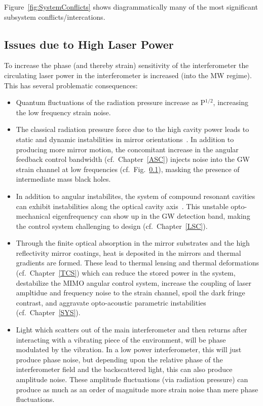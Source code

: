 Figure~\ref{fig:SystemConflicts} shows diagrammatically many of the most
significant subsystem conflicts/intercations.

\subsection{Issues due to High Laser Power}
To increase the phase (and thereby strain) sensitivity of the interferometer
the circulating laser power in the interferometer is increased (into the MW
regime). This has several problematic consequences:
\begin{itemize}
\item Quantum fluctuations of the radiation pressure increase as P$^{1/2}$, increasing the low frequency strain noise.
\item The classical radiation pressure force due to the high cavity power
leads to static and dynamic instabilities in mirror
orientations~\cite{Sidles:2006un, Dooley:13, aLIGO:ASC}. In addition to producing
more mirror motion, the concomitant increase in the angular feedback
control bandwidth (cf.~Chapter~\ref{ASC}) injects noise into the GW strain
channel at low frequencies (cf.~Fig.~\ref{}), masking the presence of intermediate mass black holes.
\item In addition to angular instabilites, the system of compound resonant cavities can exhibit instabilities along the optical cavity axis~\cite{SGLMW2004, BuCh2002, Osamu:spring}. This
unstable opto-mechanical eigenfrequency can show up in the GW detection band,
making the control system challenging to design (cf.~Chapter~\ref{LSC}).
\item Through the finite optical absorption in the mirror substrates and the
high reflectivity mirror coatings, heat is deposited in the mirrors and thermal
gradients are formed. These lead to thermal lensing and thermal deformations
(cf.~Chapter~\ref{TCS}) which can reduce the stored power in the system, destabilize
the MIMO angular control system, increase the coupling of laser ampltidue and
frequency noise to the strain channel, spoil the dark fringe contrast, and
aggravate opto-acoustic parametric instabilities (cf.~Chapter~\ref{SYS}).
\item Light which scatters out of the main interferometer and then returns after interacting with a vibrating piece of the environment, will be phase modulated by the vibration. In a low power interferometer, this will just produce phase noise, but depending upon the relative phase of the interferometer field and the backscattered light, this can also produce amplitude noise. These amplitude fluctuations (via radiation pressure) can produce as much as an order of magnitude more strain noise than mere phase fluctuations.

\end{itemize}

